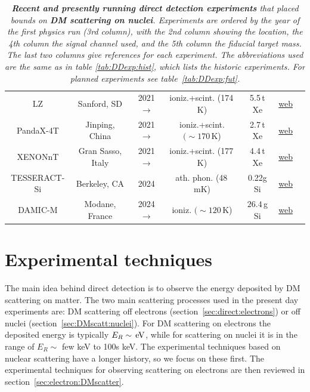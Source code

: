 \begin{table}[p]
\begin{center}
{\begin{tabular}{ccccccc}
{\sc LZ} & Sanford, SD & 2021 $\to$  &  ioniz.+scint. (174\,K) & 5.5\,t Xe & \href{https://lz.lbl.gov}{web} & \cite{LZ} \\


{\sc PandaX-4T} & Jinping, China & 2021 $\to$ &  ioniz.+scint. $(\sim 170\,$K) & 2.7\,t Xe & \href{https://pandax.sjtu.edu.cn}{web} & \cite{PandaX-4T}\\

{\sc XENONnT} & Gran Sasso, Italy & 2021 $\to$  &  ioniz.+scint. (177\,K) & 4.4\,t Xe & \href{http://www.xenon1t.org}{web} & \cite{Xenon-nT}\\

{\sc TESSERACT-Si} & Berkeley, CA  & 2024 & ath. phon. (48\,mK) &  0.22g Si & \href{https://tesseract.lbl.gov}{web} & \cite{TESSERACT} \\

   {\sc DAMIC-M} & Modane, France & 2024 $\to$ &  ioniz. $(\sim120\,$K) & $26.4$\,g Si &  \href{http://damic.uchicago.edu}{web} & \cite{DAMIC-M} \\

\hline\hline

\end{tabular}}
\end{center}
\caption[Main direct detection experiments]{\em  {\bfseries Recent and presently running direct detection experiments} that placed bounds on {\bfseries DM scattering on nuclei}. 
Experiments are ordered by the year of the first physics run (3rd column), with the 2nd column showing the location, the 4th column the signal channel used, and the 5th column the fiducial target mass.
 The last two columns give references for each experiment. The abbreviations used are the same as in table \ref{tab:DDexp:hist}, which lists the historic experiments. For planned experiments see table~\ref{tab:DDexp:fut}.  
\label{tab:DDexp}}
\end{table}










\section{Experimental techniques}\label{sec:direct:exp}
The main idea behind direct detection is to observe the energy deposited by DM scattering on matter. 
The two main scattering processes used in the present day experiments are: DM scattering off electrons (section~\ref{sec:direct:electrons}) or off nuclei (section~\ref{sec:DMscatt:nuclei}). 
For DM scattering on electrons the deposited energy is typically $E_R\sim \,{\rm eV}$, while for scattering on nuclei it is in the range of $E_R\sim$ few keV to 100s keV. The experimental techniques based on nuclear scattering have a longer history, so we focus on these first. The experimental techniques for observing scattering on electrons are then reviewed in section~\ref{sec:electron:DMscatter}.

